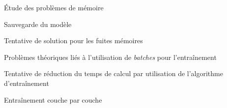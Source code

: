 \newpage
\begin{report}{Étude des problèmes de mémoire}\label{subsec:memuse}
	
\end{report}
\begin{report}{Sauvegarde du modèle}\label{subsec:save}
	
\end{report}
\begin{report}{Tentative de solution pour les fuites mémoires}\label{subsec:memleak}\label{subsec:hist}
	
\end{report}
\begin{report}{Problèmes théoriques liés à l'utilisation de \textit{batches} pour l'entraînement}\label{subsec:batch}
	
\end{report}
\begin{report}{Tentative de réduction du temps de calcul par utilisation de l'algorithme d'entraînement \og{}\fg{}}\label{subsec:tbptt}
	
\end{report}
\begin{report}{Entraînement couche par couche}\label{subsec:lbl}
	
\end{report}


